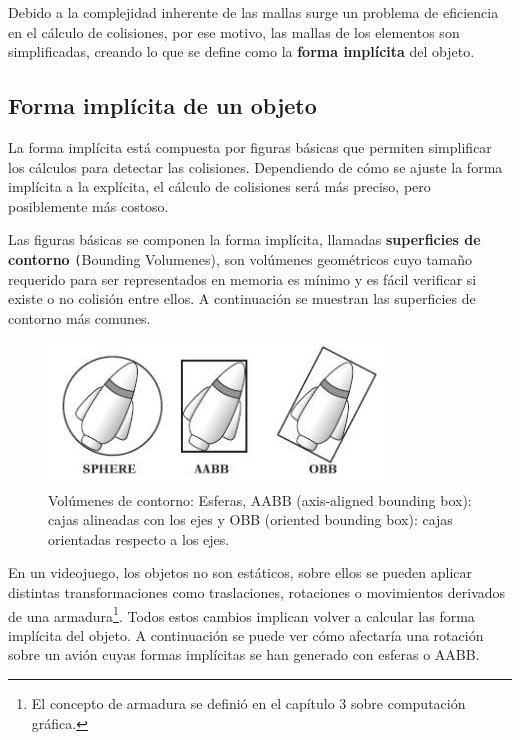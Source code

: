 Debido a la complejidad inherente de las mallas surge un problema de eficiencia en el cálculo de colisiones, por ese motivo, las mallas de los elementos son simplificadas, creando lo que se define como la \textbf{forma implícita} del objeto.

\subsection{Forma implícita de un objeto}

La forma implícita está compuesta por figuras básicas que permiten simplificar los cálculos para detectar las colisiones. Dependiendo de cómo se ajuste la forma implícita a la explícita, el cálculo de colisiones será más preciso, pero posiblemente más costoso.
\newline

Las figuras básicas se componen la forma implícita, llamadas \textbf{superficies de contorno} \texttt(Bounding Volumenes), son volúmenes geométricos cuyo tamaño requerido para ser representados en memoria es mínimo y es fácil verificar si existe o no colisión entre ellos. A continuación se muestran las superficies de contorno más comunes.

\begin{figure}[h]
	\centering	
         \includegraphics[height=3.8cm]{img/BoundingVolumes.jpg}
	\caption{Volúmenes de contorno: Esferas, AABB (axis-aligned bounding box):  cajas alineadas con los ejes y OBB (oriented bounding box): cajas orientadas respecto a los ejes.}
\end{figure}

En un videojuego, los objetos no son estáticos, sobre ellos se pueden aplicar distintas transformaciones como traslaciones, rotaciones o movimientos derivados de una armadura\footnote{El concepto de armadura se definió en el capítulo 3 sobre computación gráfica.}. Todos estos cambios implican volver a calcular las forma implícita del objeto. A continuación se puede ver cómo afectaría una rotación sobre un avión cuyas formas implícitas se han generado con esferas o AABB.
\newline

